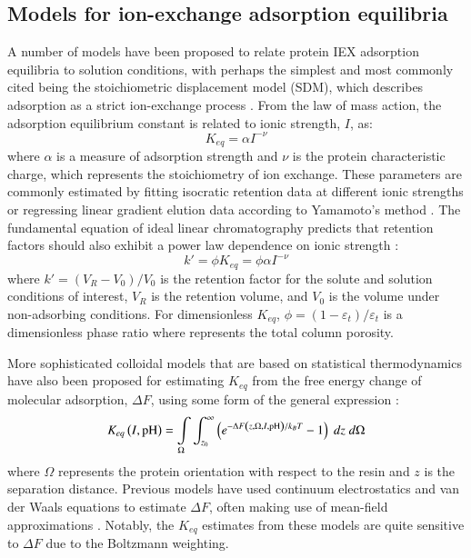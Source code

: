 \documentclass[preprint,review,12pt]{elsarticle}
\providecommand{\DIFaddtex}[1]{\protect\cbstart{#1}\protect\cbend} %
\providecommand{\DIFdeltex}[1]{\protect\cbdelete} %
\providecommand{\DIFaddbegin}{} %
\providecommand{\DIFaddend}{} %
\providecommand{\DIFdelbegin}{} %
\providecommand{\DIFdelend}{} %
\providecommand{\DIFadd}[1]{\texorpdfstring{\DIFaddtex{#1}}{#1}} %
\providecommand{\DIFdel}[1]{\texorpdfstring{\DIFdeltex{#1}}{}} %
\begin{document}
    \subsection{Models for ion-exchange adsorption equilibria} \label{ssec:electrostatics}
        A number of models have been proposed to relate protein IEX adsorption equilibria to solution conditions, with perhaps the simplest and most commonly cited being the stoichiometric displacement model (SDM), which describes adsorption as a strict ion-exchange process \cite{Boardman1955}. From the law of mass action, the adsorption equilibrium constant is related to ionic strength, $I$, as:
        \begin{equation} \label{eq:sdm}
            K_{eq} = \alpha I^{-\nu}
        \end{equation}
        where $\alpha$ is a measure of adsorption strength and $\nu$ is the protein characteristic charge, which represents the stoichiometry of ion exchange. These parameters are commonly estimated by fitting isocratic retention data at different ionic strengths or regressing linear gradient elution data according to Yamamoto's method \cite{Yamamoto1987}. The fundamental equation of ideal linear chromatography predicts that retention factors should also exhibit a power law dependence on ionic strength \cite{Guiochon2006}:
        \begin{equation} \label{eq:fundamental}
            k' = \phi K_{eq} = \phi \alpha I^{-\nu}
        \end{equation}
        where $k' = (V_R - V_0)/V_0$ is the retention factor for the solute and solution conditions of interest, $V_R$ is the retention volume, and $V_0$ is the \DIFdelbegin \DIFdel{flow-through }\DIFdelend \DIFaddbegin \DIFadd{retention }\DIFaddend volume under non-adsorbing conditions. For dimensionless $K_{eq}$, $\phi = (1 - \varepsilon_t)/\varepsilon_t$ is a dimensionless phase ratio where \DIFdelbegin \DIFdel{$\varepsilon_t = \varepsilon_c + (1 - \varepsilon_c) \varepsilon_p$ }\DIFdelend \DIFaddbegin \DIFadd{$\varepsilon_t = \varepsilon_c + (1 - \varepsilon_c) \varepsilon_p = V_0/V_{column}$ }\DIFaddend represents the total column porosity.

        More sophisticated colloidal models that are based on statistical thermodynamics have also been proposed for estimating $K_{eq}$ from the free energy change of molecular adsorption, $\Delta F$, using some form of the general expression \cite{Asthagiri1997}:
        \begin{equation} \label{eq:keq stat thermo}
            K_{eq}\left(I, \mathrm{pH} \right) = \int \displaylimits_\Omega \int_{z_0}^{\infty} \left( e^{-\Delta F \left( z, \Omega, I, \mathrm{pH} \right)/k_BT} - 1 \right) \; dz \; d\Omega
        \end{equation}
        where $\Omega$ represents the protein orientation with respect to the resin and $z$ is the separation distance. Previous models have used continuum electrostatics and van der Waals equations to estimate $\Delta F$, often making use of mean-field approximations \cite{Guelat2012, Briskot2019}. Notably, the $K_{eq}$ estimates from these models are quite sensitive to $\Delta F$ due to the Boltzmann weighting.
\end{document}
